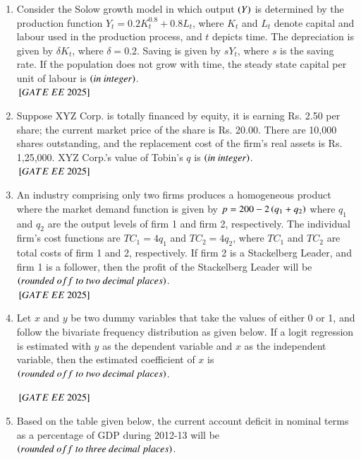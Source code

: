 \documentclass[journal,12pt,onecolumn]{IEEEtran}
\theoremstyle{remark}
\begin{document}
\begin{enumerate}
\item Consider the Solow growth model in which output $\left(Y\right)$ is determined by the production function $Y_t = 0.2 K_t^{0.8} + 0.8 L_t$, where $K_t$ and $L_t$ denote capital and labour used in the production process, and $t$ depicts time. The depreciation is given by $\delta K_t$, where $\delta = 0.2$. Saving is given by $sY_t$, where $s$ is the saving rate. If the population does not grow with time, the steady state capital per unit of labour is \underline{\hspace{2cm}} $\left(in\ integer\right)$.\\
\hfill ${}\left[GATE\ EE\ 2025\right]$
\item Suppose XYZ Corp. is totally financed by equity, it is earning Rs. 2.50 per share; the current market price of the share is Rs. 20.00. There are 10,000 shares outstanding, and the replacement cost of the firm's real assets is Rs. 1,25,000. XYZ Corp.'s value of Tobin's $q$ is \underline{\hspace{2cm}} $\left(in\ integer\right)$.\\
 \hfill ${}\left[GATE\ EE\ 2025\right]$
\item An industry comprising only two firms produces a homogeneous product where the market demand function is given by $p = 200 - 2\left(q_1 + q_2\right)$ where $q_1$ and $q_2$ are the output levels of firm 1 and firm 2, respectively. The individual firm's cost functions are $TC_1 = 4q_1$ and $TC_2 = 4q_2$, where $TC_1$ and $TC_2$ are total costs of firm 1 and 2, respectively. If firm 2 is a Stackelberg Leader, and firm 1 is a follower, then the profit of the Stackelberg Leader will be \underline{\hspace{2cm}} $\brak{rounded\ off\ to\ two\ decimal\ places}$.\\
 \hfill ${}\left[GATE\ EE\ 2025\right]$
\item Let $x$ and $y$ be two dummy variables that take the values of either 0 or 1, and follow the bivariate frequency distribution as given below. If a logit regression is estimated with $y$ as the dependent variable and $x$ as the independent variable, then the estimated coefficient of $x$ is \underline{\hspace{2cm}} $\brak{rounded\ off\ to\ two\ decimal\ places}$.

\begin{center}

\end{center}
 \hfill ${}\left[GATE\ EE\ 2025\right]$
\item Based on the table given below, the current account deficit in nominal terms as a percentage of GDP during 2012-13 will be \underline{\hspace{2cm}} $\brak{rounded\ off\ to\ three\ decimal\ places}$.\\

\begin{center}


\end{center}
\end{enumerate}
\end{document}
